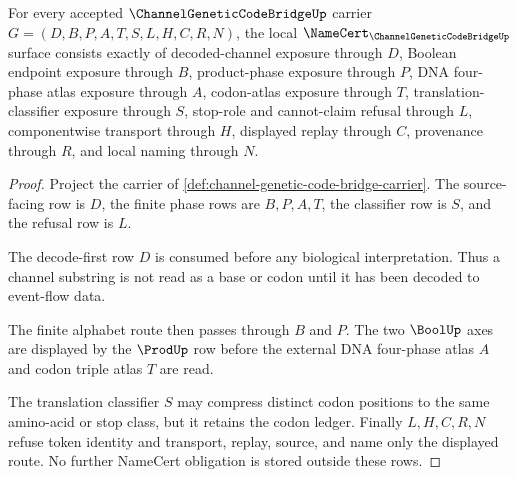 \begin{theorem}
\label{thm:channel-genetic-code-bridge-namecert-obligations}
For every accepted $\ChannelGeneticCodeBridgeUp$ carrier $G=(D,B,P,A,T,S,L,H,C,R,N)$, the local $\NameCert_{\ChannelGeneticCodeBridgeUp}$ surface consists exactly of decoded-channel exposure through $D$, Boolean endpoint exposure through $B$, product-phase exposure through $P$, DNA four-phase atlas exposure through $A$, codon-atlas exposure through $T$, translation-classifier exposure through $S$, stop-role and cannot-claim refusal through $L$, componentwise transport through $H$, displayed replay through $C$, provenance through $R$, and local naming through $N$.
\end{theorem}
\begin{proof}
Project the carrier of \autoref{def:channel-genetic-code-bridge-carrier}. The source-facing row is $D$, the finite phase rows are $B,P,A,T$, the classifier row is $S$, and the refusal row is $L$.

The decode-first row $D$ is consumed before any biological interpretation. Thus a channel substring is not read as a base or codon until it has been decoded to event-flow data.

The finite alphabet route then passes through $B$ and $P$. The two $\BoolUp$ axes are displayed by the $\ProdUp$ row before the external DNA four-phase atlas $A$ and codon triple atlas $T$ are read.

The translation classifier $S$ may compress distinct codon positions to the same amino-acid or stop class, but it retains the codon ledger. Finally $L,H,C,R,N$ refuse token identity and transport, replay, source, and name only the displayed route. No further NameCert obligation is stored outside these rows.
\end{proof}

